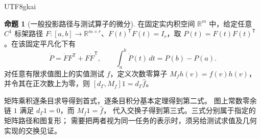 \documentclass[12pt]{report}
\makeatletter
\theoremstyle{definition}
\newtheorem{proposition}{命题}[chapter]
\renewenvironment{proof}[1][\proofname]{\par
  \pushQED{\qed}\normalfont
  \topsep6\p@\@plus6\p@\relax
  \trivlist
  \item[\hskip\labelsep\normalfont #1\@addpunct{.}]\ignorespaces
}{
  \popQED\endtrivlist\@endpefalse
}
\newcommand{\RR}{\mathbb R}
\makeatother
\begin{document}
\begin{CJK*}{UTF8}{gkai}
\begin{proposition}[一般投影路径与测试算子的微分]
\label{prop:bound-operators}
在固定实内积空间 \(\RR^m\) 中，给定任意 \(C^1\) 标架路径
\(F:[a,b]\to\RR^{m\times r}\)、\(F(t)^{\mathsf T}F(t)=I_r\)，取
\(P(t)=F(t)F(t)^{\mathsf T}\)。在该固定平凡化下有
\[
\dot P=\dot F F^{\mathsf T}+F\dot F^{\mathsf T},\qquad
\int_a^b\dot P(t)\,dt=P(b)-P(a).
\]
对任意有限求值图上的实值测试 \(f\)，定义次数零算子
\(M_fh(v)=f(v)h(v)\)，并令其在正次数上为零，则
\([d_\Gamma,M_f]1=d_\Gamma\widehat f\)。
\end{proposition}
\begin{proof}
矩阵乘积逐条目求导得到首式，逐条目积分基本定理得到第二式。
图上常数零余链 \(1\) 满足 \(d_\Gamma1=0\)，而 \(M_f1=\widehat f\)，
代入交换子得到第三式。三式分别属于指定的矩阵路径和图复形；
需要把两者视为同一任务的表示时，须另给测试求值及几何实现的交换见证。
\end{proof}


\end{CJK*}
\end{document}
